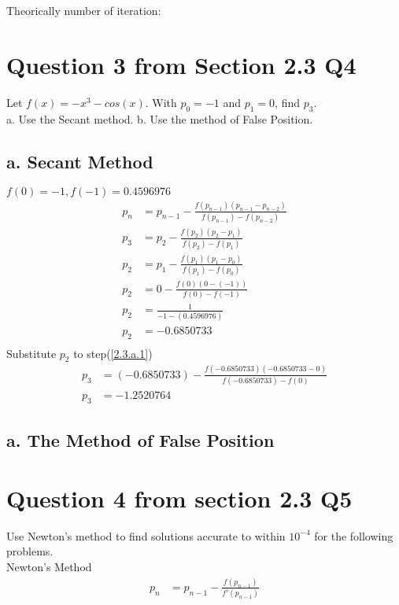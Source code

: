 \documentclass{article}
\begin{document}
Theorically number of iteration:

\section{Question 3 from Section 2.3 Q4}
Let $f(x)=-x^3-cos(x)$. With $p_0 =-1$ and $p_1 = 0$, find $p_3$.\\
a. Use the Secant method. b. Use the method of False Position.
\subsection{a. Secant Method}
$f(0)=-1, f(-1)=0.4596976$
\begin{align}
\label{secant_theorem}p_n & = p_{n-1}-\frac{f(p_{n-1})(p_{n-1}-p_{n-2})}{f(p_{n-1})-f(p_{n-2})}\\
\label{2.3.a.1}p_3 & = p_2 - \frac{f(p_2)(p_2-p_1)}{f(p_2)-f(p_1)}\\
\label{2.3.a.2}p_2 & = p_1 - \frac{f(p_1)(p_1-p_0)}{f(p_1)-f(p_0)}\\
\label{2.3.a.3}p_2 & = 0 - \frac{f(0)(0-(-1))}{f(0)-f(-1)}\\
\label{2.3.a.4}p_2 & = \frac{1}{-1-(0.4596976)}\\
\label{2.3.a.5}p_2 & = -0.6850733\\
\end{align}
Substitute $p_2$ to step(\ref{2.3.a.1})
\begin{align}
\label{2.3.a.6}p_3 & = (-0.6850733) - \frac{f(-0.6850733)(-0.6850733-0)}{f(-0.6850733)-f(0)}\\
\label{2.3.a.7}p_3 & = -1.2520764
\end{align}

\subsection{a. The Method of False Position}


\section{Question 4 from section 2.3 Q5}
Use Newton’s method to find solutions accurate to within $10^{-4}$ for the following problems.\\
Newton's Method
\begin{align}
\label{newton_method} p_n & = p_{n-1} - \frac{f(p_{n-1})}{f'(p_{n-1})}
\end{align}
\end{document}
